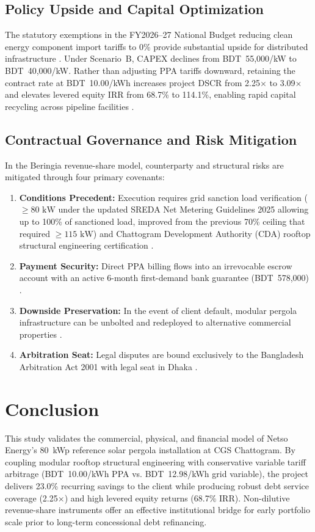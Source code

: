 \documentclass[11pt,a4paper]{article}
\begin{document}
\subsection{Policy Upside and Capital Optimization}
The statutory exemptions in the FY2026--27 National Budget reducing clean energy component import tariffs to 0\% provide substantial upside for distributed infrastructure \cite{gt_constants}. Under Scenario~B, CAPEX declines from BDT~55,000/kW to BDT~40,000/kW. Rather than adjusting PPA tariffs downward, retaining the contract rate at BDT~10.00/kWh increases project DSCR from 2.25$\times$ to 3.09$\times$ and elevates levered equity IRR from 68.7\% to 114.1\%, enabling rapid capital recycling across pipeline facilities \cite{gt_constants}.

\subsection{Contractual Governance and Risk Mitigation}
In the Beringia revenue-share model, counterparty and structural risks are mitigated through four primary covenants:
\begin{enumerate}
    \item \textbf{Conditions Precedent:} Execution requires grid sanction load verification ($\ge 80\text{ kW}$ under the updated SREDA Net Metering Guidelines 2025 allowing up to 100\% of sanctioned load, improved from the previous 70\% ceiling that required $\ge 115\text{ kW}$) and Chattogram Development Authority (CDA) rooftop structural engineering certification \cite{rsa_doc}.
    \item \textbf{Payment Security:} Direct PPA billing flows into an irrevocable escrow account with an active 6-month first-demand bank guarantee (BDT~578,000) \cite{rsa_doc}.
    \item \textbf{Downside Preservation:} In the event of client default, modular pergola infrastructure can be unbolted and redeployed to alternative commercial properties \cite{stress_test}.
    \item \textbf{Arbitration Seat:} Legal disputes are bound exclusively to the Bangladesh Arbitration Act 2001 with legal seat in Dhaka \cite{rsa_doc}.
\end{enumerate}

\section{Conclusion}
This study validates the commercial, physical, and financial model of Netso Energy's 80~kWp reference solar pergola installation at CGS Chattogram. By coupling modular rooftop structural engineering with conservative variable tariff arbitrage (BDT~10.00/kWh PPA vs. BDT~12.98/kWh grid variable), the project delivers 23.0\% recurring savings to the client while producing robust debt service coverage (2.25$\times$) and high levered equity returns (68.7\% IRR). Non-dilutive revenue-share instruments offer an effective institutional bridge for early portfolio scale prior to long-term concessional debt refinancing.
\end{document}
